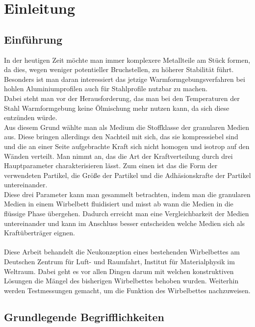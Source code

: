 \chapter{Einleitung}


\section{Einführung}

In der heutigen Zeit möchte man immer komplexere Metallteile am Stück formen, da dies, wegen weniger potentieller Bruchstellen, zu höherer Stabilität führt. Besonders ist man daran interessiert das jetzige Warmformgebungsverfahren bei hohlen Aluminiumprofilen auch für Stahlprofile nutzbar zu machen. \\
Dabei steht man vor der Herausforderung, das man bei den Temperaturen der Stahl Warmformgebung keine Ölmischung mehr nutzen kann, da sich diese entzünden würde. \\
Aus diesem Grund wählte man als Medium die Stoffklasse der granularen Medien aus. Diese bringen allerdings den Nachteil mit sich, das sie kompressiebel sind und die an einer Seite aufgebrachte Kraft sich nicht homogen und isotrop auf den Wänden verteilt. 
Man nimmt an, das die Art der Kraftverteilung durch drei Hauptparameter charakterisieren lässt. Zum einen ist das die Form der verwendeten Partikel, die Größe der Partikel und die Adhäsionskrafte der Partikel untereinander. \\
Diese drei Parameter kann man gesammelt betrachten, indem man die granularen Medien in einem Wirbelbett fluidisiert und misst ab wann die Medien in die flüssige Phase übergehen. Dadurch erreicht man eine Vergleichbarkeit der Medien untereinander und kann im Anschluss besser entscheiden welche Medien sich als Kraftüberträger eignen. \\
\hfil \\
Diese Arbeit behandelt die Neukonzeption eines bestehenden Wirbelbettes am Deutschen Zentrum für Luft- und Raumfahrt, Institut für Materialphysik im Weltraum. Dabei geht es vor allen Dingen darum mit welchen konstruktiven Lösungen die Mängel des bisherigen Wirbelbettes behoben wurden. Weiterhin werden Testmessungen gemacht, um die Funktion des Wirbelbettes nachzuweisen.



\section{Grundlegende Begrifflichkeiten}


